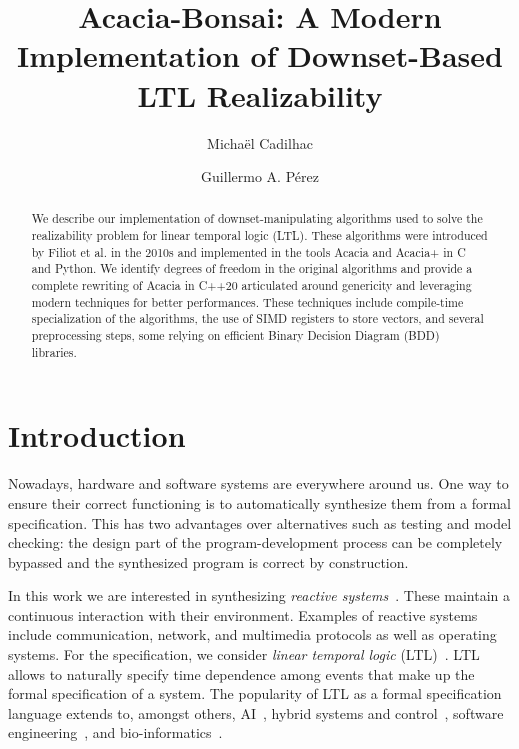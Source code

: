 \documentclass[runningheads,a4paper,draft]{llncs}
\begin{document}
\title{Acacia-Bonsai: A Modern Implementation of Downset-Based LTL Realizability}

\author{Micha\"el Cadilhac%
\and Guillermo A. P\'erez%
}

\maketitle

\begin{abstract}
  We describe our implementation of downset-manipulating algorithms used to solve the
  realizability problem for linear temporal logic (LTL). These algorithms were
  introduced by Filiot et al. in the 2010s and implemented in the tools Acacia
  and Acacia+ in C and Python.  We identify degrees of freedom in the original
  algorithms and provide a complete rewriting of Acacia in C++20 articulated
  around genericity and leveraging modern techniques for better performances.
  These techniques include compile-time specialization of the algorithms, the
  use of SIMD registers to store vectors, and several preprocessing steps, some
  relying on efficient Binary Decision Diagram (BDD) libraries.
\end{abstract}

\section{Introduction}

Nowadays, hardware and software systems are everywhere around us. One way to
ensure their correct functioning is to automatically synthesize them from a
formal specification.  This has two advantages over alternatives such as
testing and model checking: the design part of the program-development process
can be completely bypassed and the synthesized program is correct by
construction.

In this work we are interested in synthesizing \emph{reactive
systems}~\cite{hp84}. These maintain a continuous interaction with their
environment.  Examples of reactive systems include communication, network, and
multimedia protocols as well as operating systems.  For the specification, we
consider \emph{linear temporal logic} (LTL)~\cite{pnueli77}. LTL allows to
naturally specify time dependence among events that make up the formal
specification of a system. The popularity of LTL as a formal specification
language extends to, amongst others, AI~\cite{gv16,cm19,gnpw20}, hybrid
systems and control~\cite{bvpyb16}, software engineering~\cite{lpb15}, and
bio-informatics~\cite{abbdfhinprs17}.
\end{document}
